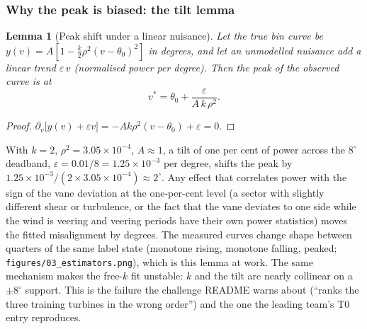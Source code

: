 \documentclass[11pt,a4paper]{article}
\newtheorem{lemma}{Lemma}
\theoremstyle{remark}
\newcommand{\dg}{^{\circ}}
\newcommand{\code}[1]{\texttt{#1}}
\begin{document}
\subsubsection{Why the peak is biased: the tilt lemma}\label{sec:c1_bias}
\begin{lemma}[Peak shift under a linear nuisance]\label{lem:tilt}
Let the true bin curve be $y(v)=A[1-\tfrac{k}{2}\rho^2(v-\theta_0)^2]$ in
degrees, and let an unmodelled nuisance add a linear trend $\varepsilon\,v$
(normalised power per degree). Then the peak of the observed curve is at
\begin{equation}
  v^\ast = \theta_0 + \frac{\varepsilon}{A\,k\,\rho^2}.
\end{equation}
\end{lemma}
\begin{proof}
$\partial_v\big[y(v)+\varepsilon v\big] = -A k\rho^2 (v-\theta_0) + \varepsilon = 0$.
\end{proof}
With $k=2$, $\rho^2=3.05\times10^{-4}$, $A\approx1$, a tilt of one per cent of
power across the $8\dg$ deadband, $\varepsilon=0.01/8=1.25\times10^{-3}$ per
degree, shifts the peak by $1.25\times10^{-3}/(2\times3.05\times10^{-4})\approx2\dg$.
Any effect that correlates power with the sign of the vane deviation at the
one-per-cent level (a sector with slightly different shear or turbulence, or the
fact that the vane deviates to one side while the wind is veering and veering
periods have their own power statistics) moves the fitted misalignment by
degrees. The measured curves change shape between quarters of the same label
state (monotone rising, monotone falling, peaked; \code{figures/03\_estimators.png}),
which is this lemma at work. The same mechanism makes the free-$k$ fit unstable:
$k$ and the tilt are nearly collinear on a $\pm8\dg$ support. This is the
failure the challenge README warns about (``ranks the three training turbines
in the wrong order'') and the one the leading team's T0 entry reproduces.
\end{document}

